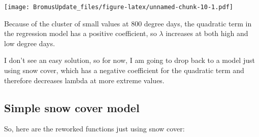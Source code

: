 \documentclass[]{article}
\begin{document}
\texttt{[image: BromusUpdate\_files/figure-latex/unnamed-chunk-10-1.pdf]}

Because of the cluster of small values at 800 degree days, the quadratic
term in the regression model has a positive coefficient, so \(\lambda\)
increases at both high and low degree days.

I don't see an easy solution, so for now, I am going to drop back to a
model just using snow cover, which has a negative coefficient for the
quadratic term and therefore decreases lambda at more extreme values.

\hypertarget{simple-snow-cover-model}{%
\subsection{Simple snow cover model}\label{simple-snow-cover-model}}

So, here are the reworked functions just using snow cover:
\end{document}
